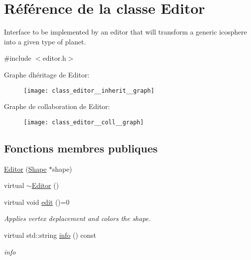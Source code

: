 \hypertarget{class_editor}{}\section{Référence de la classe Editor}
\label{class_editor}


Interface to be implemented by an editor that will transform a generic icosphere into a given type of planet.  




{\ttfamily \#include $<$editor.\+h$>$}



Graphe d\textquotesingle{}héritage de Editor\+:
\nopagebreak
\begin{figure}[H]
\begin{center}
\leavevmode
\texttt{[image: class\_editor\_\_inherit\_\_graph]}
\end{center}
\end{figure}


Graphe de collaboration de Editor\+:
\nopagebreak
\begin{figure}[H]
\begin{center}
\leavevmode
\texttt{[image: class\_editor\_\_coll\_\_graph]}
\end{center}
\end{figure}
\subsection*{Fonctions membres publiques}
\begin{DoxyCompactItemize}
\item 
\hyperlink{class_editor_aea7f803e3bbb79dbbeb9a9ad9b01ed5a}{Editor} (\hyperlink{class_shape}{Shape} $\ast$shape)
\item 
virtual \hyperlink{class_editor_ab9aea98e4964b437a937354d2f3edd42}{$\sim$\+Editor} ()
\item 
virtual void \hyperlink{class_editor_abca97ba11536c494a0c26bac77917792}{edit} ()=0
\begin{DoxyCompactList}\small\item\em Applies vertex deplacement and colors the shape. \end{DoxyCompactList}\item 
virtual std\+::string \hyperlink{class_editor_a5747cd74b71d67f6d39b094071058382}{info} () const
\begin{DoxyCompactList}\small\item\em info \end{DoxyCompactList}\end{DoxyCompactItemize}
